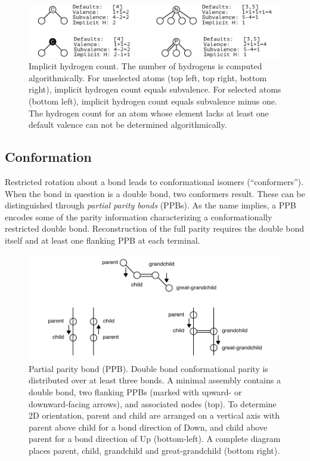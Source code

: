 \documentclass{article}
\begin{document}
\begin{figure}
    \centering
    \includegraphics[width=\columnwidth]{implicit-hydrogen-count.pdf}
    \caption{Implicit hydrogen count. The number of hydrogens is computed algorithmically. For unselected atoms (top left, top right, bottom right), implicit hydrogen count equals subvalence. For selected atoms (bottom left), implicit hydrogen count equals subvalence minus one. The hydrogen count for an atom whose element lacks at least one default valence can not be determined algorithmically.}
    \label{fig:implicit-hydrogen-count}
\end{figure}

\subsection*{Conformation}
\label{conformation}

Restricted rotation about a bond leads to conformational isomers (\enquote{conformers}). When the bond in question is a double bond, two conformers result. These can be distinguished through \textit{partial parity bonds} (PPBs). As the name implies, a PPB encodes some of the parity information characterizing a conformationally restricted double bond. Reconstruction of the full parity requires the double bond itself and at least one flanking PPB at each terminal.

\begin{figure}
    \centering
    \includegraphics[width=\columnwidth]{partial-parity-bond.pdf}
    \caption{Partial parity bond (PPB). Double bond conformational parity is distributed over at least three bonds. A minimal assembly contains a double bond, two flanking PPBs (marked with upward- or downward-facing arrows), and associated nodes (top). To determine 2D orientation, parent and child are arranged on a vertical axis with parent above child for a bond direction of Down, and child above parent for a bond direction of Up (bottom-left). A complete diagram places parent, child, grandchild and great-grandchild (bottom right).}
    \label{fig:partial-parity-bonds}
\end{figure}
\end{document}
